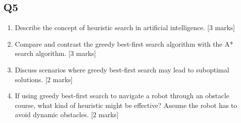 \documentclass[a4wide]{article}
\begin{document}
\subsection*{Q5}
\begin{enumerate}
\item Describe the concept of heuristic search in artificial intelligence. [3 marks]
\item Compare and contrast the greedy best-first search algorithm with the A* search algorithm. [3 marks]
\item Discuss scenarios where greedy best-first search may lead to suboptimal solutions. [2 marks]
\item If using greedy best-first search to navigate a robot through an obstacle course, what kind of heuristic might be effective? Assume the robot has to avoid dynamic obstacles. [2 marks]
\end{enumerate}
\end{document}
